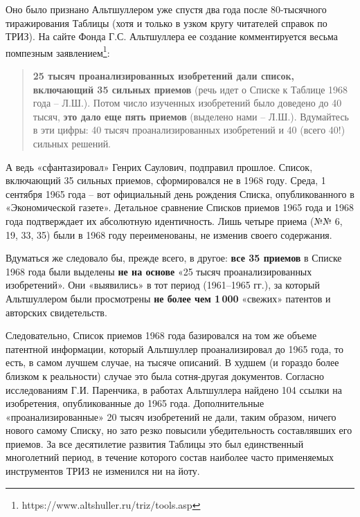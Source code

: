 \documentclass[11pt,a4paper]{article}
\begin{document}
Оно было признано Альтшуллером уже спустя два года после 80-тысячного
тиражирования Таблицы (хотя и только в узком кругу читателей справок по ТРИЗ).
На сайте Фонда Г.С. Альтшуллера ее создание комментируется весьма помпезным
заявлением\footnote{https://www.altshuller.ru/triz/tools.asp}:
\begin{quote}
  \textbf{25 тысяч проанализированных изобретений дали список, включающий 35
    сильных приемов} (речь идет о Списке к Таблице 1968 года -- Л.Ш.). Потом
  число изученных изобретений было доведено до 40 тысяч, \textbf{это дало еще
    пять приемов} (выделено нами -- Л.Ш.). Вдумайтесь в эти цифры: 40 тысяч
  проанализированных изобретений и 40 (всего 40!) сильных решений.
\end{quote}
А ведь «сфантазировал» Генрих Саулович, подправил прошлое. Список, включающий
35 сильных приемов, сформировался не в 1968 году. Среда, 1 сентября 1965 года
-- вот официальный день рождения Списка, опубликованного в «Экономической
газете». Детальное сравнение Списков приемов 1965 года \cite{Altshuller1965} и
1968 года \cite{Altshuller1969} подтверждает их абсолютную идентичность. Лишь
четыре приема (№№ 6, 19, 33, 35) были в 1968 году переименованы, не изменив
своего содержания.

Вдуматься же следовало бы, прежде всего, в другое: \textbf{все 35 приемов} в
Списке 1968 года были выделены \textbf{не на основе} «25 тысяч
проанализированных изобретений». Они «выявились» в тот период (1961--1965
гг.), за который Альтшуллером были просмотрены \textbf{не более чем 1\,000}
«свежих» патентов и авторских свидетельств.

Следовательно, Список приемов 1968 года базировался на том же объеме патентной
информации, который Альтшуллер проанализировал до 1965 года, то есть, в самом
лучшем случае, на тысяче описаний. В худшем (и гораздо более близком к
реальности) случае это была сотня-другая документов. Согласно исследованиям
Г.И. Паренчика, в работах Альтшуллера найдено 104 ссылки на изобретения,
опубликованные до 1965 года. Дополнительные «проанализированные» 20 тысяч
изобретений не дали, таким образом, ничего нового самому Списку, но зато резко
повысили убедительность составлявших его приемов. За все десятилетие развития
Таблицы это был единственный многолетний период, в течение которого состав
наиболее часто применяемых инструментов ТРИЗ не изменился ни на йоту.
\end{document}
